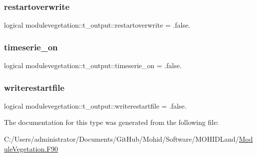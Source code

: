 \subsubsection{\texorpdfstring{restartoverwrite}{restartoverwrite}}
{\footnotesize\ttfamily logical modulevegetation\+::t\+\_\+output\+::restartoverwrite = .false.\hspace{0.3cm}{\ttfamily [private]}}

\mbox{\label{structmodulevegetation_1_1t__output_a3297acacbcaa641f26601b18b392a251}} 
\subsubsection{\texorpdfstring{timeserie\+\_\+on}{timeserie\_on}}
{\footnotesize\ttfamily logical modulevegetation\+::t\+\_\+output\+::timeserie\+\_\+on = .false.\hspace{0.3cm}{\ttfamily [private]}}

\mbox{\label{structmodulevegetation_1_1t__output_a2973f57c15929e1af26c360c823fd489}} 
\subsubsection{\texorpdfstring{writerestartfile}{writerestartfile}}
{\footnotesize\ttfamily logical modulevegetation\+::t\+\_\+output\+::writerestartfile = .false.\hspace{0.3cm}{\ttfamily [private]}}



The documentation for this type was generated from the following file\+:\begin{DoxyCompactItemize}
\item 
C\+:/\+Users/administrator/\+Documents/\+Git\+Hub/\+Mohid/\+Software/\+M\+O\+H\+I\+D\+Land/\mbox{\hyperlink{_module_vegetation_8_f90}{Module\+Vegetation.\+F90}}\end{DoxyCompactItemize}
